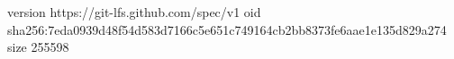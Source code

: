 version https://git-lfs.github.com/spec/v1
oid sha256:7eda0939d48f54d583d7166c5e651c749164cb2bb8373fe6aae1e135d829a274
size 255598
